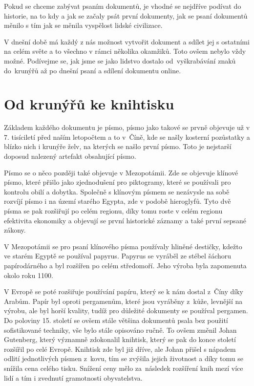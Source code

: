 Pokud se chceme zabývat psaním dokumentů, je vhodné se nejdříve podívat do historie, na to kdy a jak se začaly psát první dokumenty, jak se psaní dokumentů
měnilo s tím jak se měnila vyspělost lidské civilizace.

V dnešní době má každý z nás možnost vytvořit dokument a sdílet jej s ostatními na celém světe a to všechno v rámci několika okamžiků. Toto ovšem nebylo
vždy možné. Podívejme se, jak jsme se jako lidstvo dostalo od~vyškrabávání znaků do~krunýřů až po dnešní psaní a sdílení dokumentu online.

\section{Od krunýřů ke knihtisku}

Základem každého dokumentu je písmo, písmo jako takové se prvně objevuje už v 7. tisíciletí před naším letopočtem a to v~Číně,
kde se našly kosterní pozůstatky a blízko nich i krunýře želv, na kterých se našlo první písmo. \cite{EarliestWriting} Toto je nejstarší doposud
nalezený artefakt obsahující písmo.

Písmo se o něco později také objevuje v Mezopotámii. Zde se objevuje klínové písmo, které přišlo jako zjednodušení pro piktogramy, které se používali
pro kontrolu obilí a dobytka. Společně s klínovým písmem se nezávysle na sobě rozvíjí písmo i na území starého Egypta, zde v podobě hieroglyfů. Tyto dvě
písma se pak rozšiřují po celém regionu, díky tomu roste v celém regionu efektivita ekonomiky a objevují se první historické záznamy
\cite{MesopotamiaHistory} a také první sepsané zákony.

V Mezopotámii se pro psaní klínového písma používaly hliněné destičky, kdežto ve starém Egyptě se používal papyrus. Papyrus se vyráběl ze stébel šáchoru
papírodárného a byl rozšířen po celém středomoří. Jeho výroba byla zapomenuta okolo roku 1100.

V Evropě se poté rozšiřuje používání papíru, který se k nám dostal z~Číny díky Arabům. Papír byl oproti pergamenům, které jsou vyráběny z~kůže, levnější
na výrobu, ale byl horší kvality, tudíž pro důležité dokumenty se používal pergamen. Do poloviny 15. století se ovšem stále většina dokumentů psala bez
použití sofistikované techniky, vše bylo stále opisováno ručně. To ovšem změnil Johan Gutenberg, který významně zdokonalil knihtisk, který se pak do
konce století rozšířil po celé Evropě. Knihtisk zde byl již dříve, ale Johan přišel s nápadem odlití jednotlivých písmen z~kovu, tím se zvýšila
jejich životnost a díky tomu se snížila cena celého tisku. Snížení ceny mělo za~následek rozšíření knih mezí více lidí a tím i zvednutí gramotnosti
obyvatelstva. \cite{ucebnice1}

